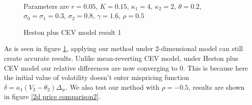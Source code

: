 \begin{figure}[ht]
  \hfill
   \\
  \hfill
  \caption{Heston plus CEV model result 1}
  \small{Parameters are $r=0.05$, $K=0.15$, $\kappa_1=4$, $\kappa_2=2$, $\theta=0.2$, $\sigma_0=\sigma_1=0.3$, $\sigma_2=0.8$, $\gamma=1.6$, $\rho=0.5$}
  \label{2d price comparison1}
\end{figure}

As is seen in figure \ref{2d price comparison1}, applying our method under 2-dimensional model can still create accurate results. Unlike mean-reverting CEV model, under Heston plus CEV model our relative differences are now converging to 0. This is because here the initial value of volatility doesn't enter mispricing function $\delta = \kappa_1(V_2-\theta_2) \Delta_{\bar{w}}$. We also test our method with $\rho=-0.5$, results are shown in figure \ref{2d price comparison2}.

